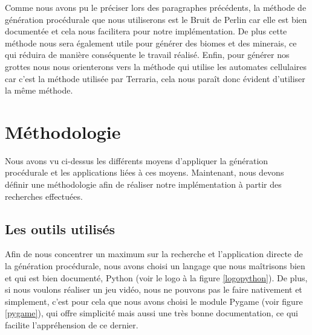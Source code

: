 \documentclass[12pt]{article}
\begin{document}
Comme nous avons pu le préciser lors des paragraphes précédents, la méthode de génération procédurale que nous utiliserons est le Bruit de Perlin car elle est bien documentée et cela nous facilitera pour notre implémentation. De plus cette méthode nous sera également utile pour générer des biomes et des minerais, ce qui réduira de manière conséquente le travail réalisé. Enfin, pour générer nos grottes nous nous orienterons vers la méthode qui utilise les automates cellulaires car c'est la méthode utilisée par Terraria, cela nous paraît donc évident d'utiliser la même méthode. 
\newpage
\section{Méthodologie}

Nous avons vu ci-dessus les différents moyens d'appliquer la génération procédurale et les applications liées à ces moyens. Maintenant, nous devons définir une méthodologie afin de réaliser notre implémentation à partir des recherches effectuées.

\subsection{Les outils utilisés}

Afin de nous concentrer un maximum sur la recherche et l'application directe de la génération procédurale, nous avons choisi un langage que nous maîtrisons bien et qui est bien documenté, Python (voir le logo à la figure \ref{logopython}). De plus, si nous voulons réaliser un jeu vidéo, nous ne pouvons pas le faire nativement et simplement, c'est pour cela que nous avons choisi le module Pygame (voir figure \ref{pygame}), qui offre simplicité mais aussi une très bonne documentation, ce qui facilite l’appréhension de ce dernier.\par
\end{document}

